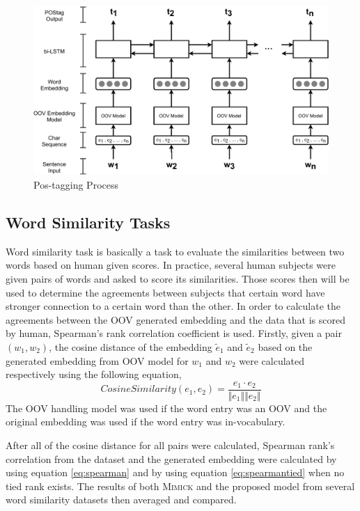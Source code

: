         \begin{figure}
            \centering
            \includegraphics[width=.8\linewidth]{images/postag.pdf}
            \caption{Pos-tagging Process}
            \label{fig:postag}
        \end{figure}
 
    \subsection{Word Similarity Tasks}
        Word similarity task is basically a task to evaluate the
        similarities between two words based on human given scores. In
        practice, several human subjects were given pairs of words and
        asked to score its similarities. Those scores then will be
        used to determine the agreements between subjects that certain
        word have stronger connection to a certain word than the
        other. In order to calculate the agreements between the OOV
        generated embedding and the data that is scored by human,
        Spearman's rank correlation coefficient is used. Firstly,
        given a pair $(w_1, w_2)$, the cosine distance of the
        embedding $\tilde{e}_1$ and $\tilde{e}_2$ based on the
        generated embedding from OOV model for $w_1$ and $w_2$ were
        calculated respectively using the following equation,
        \begin{equation}
            \label{eq:cosinesim}
            CosineSimilarity(e_1, e_2) = \frac{e_1 \cdot e_2}{\Vert e_1 \Vert \Vert e_2 \Vert}
        \end{equation}
        The OOV handling model was used if the word entry was an OOV and 
        the original embedding was used if the word entry was in-vocabulary.

        After all of the cosine distance for all pairs were calculated,
        Spearman rank's correlation from the dataset and the generated
        embedding were calculated by using equation \ref{eq:spearman}
        and by using equation \ref{eq:spearmantied} when no tied rank
        exists. The results of both \textsc{Mimick} and the proposed
        model from several word similarity datasets then averaged and
        compared.
        
